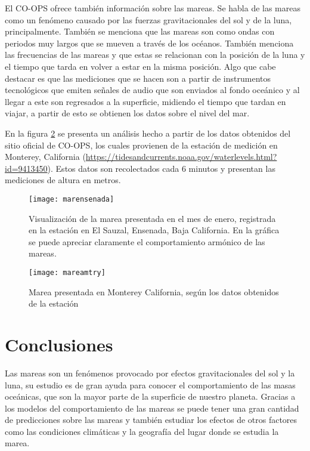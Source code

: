 El CO-OPS ofrece también información sobre las mareas. Se habla de las  mareas como un fenómeno causado por las fuerzas gravitacionales del sol y de la luna, principalmente. También se menciona que las mareas son como ondas con periodos muy largos que se mueven a través de los océanos. También menciona las frecuencias de las mareas y que estas se relacionan con la posición de la luna y el tiempo que tarda en volver a estar en la misma posición. Algo que cabe destacar es que las mediciones que se hacen son a partir de instrumentos tecnológicos que emiten señales de audio que son enviados al fondo oceánico y al llegar a este son regresados a la superficie, midiendo el tiempo que tardan en viajar, a partir de esto se obtienen los datos sobre el nivel del mar.

En la figura \ref{mtryNOAA} se presenta un análisis hecho a partir de los datos obtenidos del sitio oficial de CO-OPS, los cuales provienen de la estación de medición en Monterey, California (\url{https://tidesandcurrents.noaa.gov/waterlevels.html?id=9413450}). Estos datos son recolectados cada 6 minutos y presentan las mediciones de altura en metros.

\begin{figure}[ht!]
\centering
\texttt{[image: marensenada]}
\caption{Visualización de la marea presentada en el mes de enero, registrada en la estación en El Sauzal, Ensenada, Baja California. En la gráfica se puede apreciar claramente el comportamiento armónico de las mareas.}
\label{marensenada11}
\end{figure}

\begin{figure}[ht!]
\centering
\texttt{[image: mareamtry]}
\caption{Marea presentada en Monterey California, según los datos obtenidos de la estación}
\label{mtryNOAA}
\end{figure}

\pagebreak
\newpage

\section*{Conclusiones}
Las mareas son un fenómenos provocado por efectos gravitacionales del sol y la luna, su estudio es de gran ayuda para conocer el comportamiento de las masas oceánicas, que son la mayor parte de la superficie de nuestro planeta. Gracias a los modelos del comportamiento de las mareas se puede tener una gran cantidad de predicciones sobre las mareas y también estudiar los efectos de otros factores como las condiciones climáticas y la geografía del lugar donde se estudia la marea.

